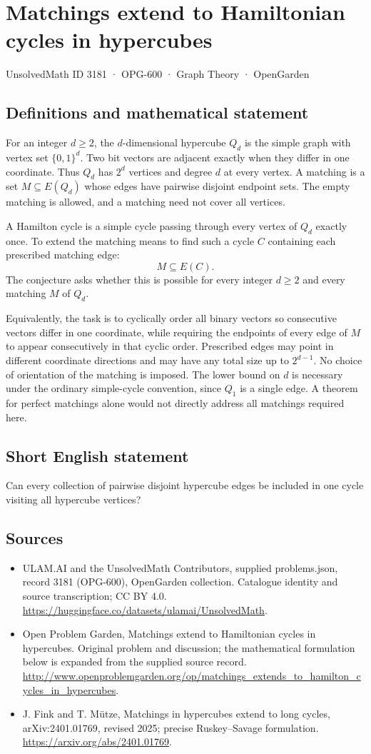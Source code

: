 \documentclass[11pt,a4paper]{article}
\begin{document}
\section*{Matchings extend to Hamiltonian cycles in hypercubes}\label{3181}
{\small UnsolvedMath ID 3181 · OPG-600 · Graph Theory · OpenGarden}
\subsection{Definitions and mathematical statement}
For an integer $d\geq2$, the $d$-dimensional hypercube
$Q_d$ is the simple graph with vertex set $\{0,1\}^d$.
Two bit vectors are adjacent exactly when they differ
in one coordinate. Thus $Q_d$ has $2^d$ vertices and
degree $d$ at every vertex. A matching is a set
$M\subseteq E(Q_d)$ whose edges have pairwise disjoint
endpoint sets. The empty matching is allowed, and a
matching need not cover all vertices.

A Hamilton cycle is a simple cycle passing through
every vertex of $Q_d$ exactly once. To extend the
matching means to find such a cycle $C$ containing
each prescribed matching edge:
\[
 M\subseteq E(C).
\]
The conjecture asks whether this is possible for every
integer $d\geq2$ and every matching $M$ of $Q_d$.

Equivalently, the task is to cyclically order all binary
vectors so consecutive vectors differ in one coordinate,
while requiring the endpoints of every edge of $M$ to
appear consecutively in that cyclic order. Prescribed
edges may point in different coordinate directions and
may have any total size up to $2^{d-1}$. No choice of
orientation of the matching is imposed. The lower bound
on $d$ is necessary under the ordinary simple-cycle
convention, since $Q_1$ is a single edge. A theorem for
perfect matchings alone would not directly address all
matchings required here.
\subsection{Short English statement}
Can every collection of pairwise disjoint hypercube edges be included in one cycle visiting all hypercube vertices?
\subsection{Sources}
\begin{itemize}
\item[S1] ULAM.AI and the UnsolvedMath Contributors, supplied problems.json, record 3181 (OPG-600), OpenGarden collection. Catalogue identity and source transcription; CC BY 4.0.
\url{https://huggingface.co/datasets/ulamai/UnsolvedMath}.
\item[S2] Open Problem Garden, Matchings extend to Hamiltonian cycles in hypercubes. Original problem and discussion; the mathematical formulation below is expanded from the supplied source record.
\url{http://www.openproblemgarden.org/op/matchings_extends_to_hamilton_cycles_in_hypercubes}.
\item[S3] J. Fink and T. Mütze, Matchings in hypercubes extend to long cycles, arXiv:2401.01769, revised 2025; precise Ruskey–Savage formulation.
\url{https://arxiv.org/abs/2401.01769}.
\end{itemize}
\end{document}
